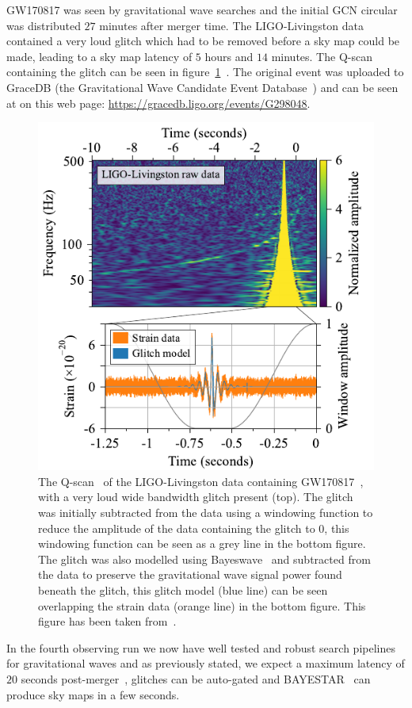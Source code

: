 GW170817 was seen by gravitational wave searches and the initial GCN circular was distributed $27$ minutes after merger time. The LIGO-Livingston data contained a very loud glitch which had to be removed before a sky map could be made, leading to a sky map latency of $5$ hours and $14$ minutes. The Q-scan containing the glitch can be seen in figure~\ref{6:fig:gw170817_glitch}~\cite{GW170817:2017}. The original event was uploaded to GraceDB (the Gravitational Wave Candidate Event Database~\cite{ligo_gracedb:2024}) and can be seen at on this web page: \href{https://gracedb.ligo.org/events/G298048}{https://gracedb.ligo.org/events/G298048}.
%
\begin{figure}
    \centering
    \includegraphics[width=1.0\linewidth]{images/6_earlywarning/gw170817/GW170817_glitch_subtraction.pdf}
    \caption{The Q-scan~\cite{qscan:2004} of the LIGO-Livingston data containing GW170817~\cite{GW170817:2017}, with a very loud wide bandwidth glitch present (top). The glitch was initially subtracted from the data using a windowing function to reduce the amplitude of the data containing the glitch to $0$, this windowing function can be seen as a grey line in the bottom figure. The glitch was also modelled using Bayeswave~\cite{BayesWave:2015} and subtracted from the data to preserve the gravitational wave signal power found beneath the glitch, this glitch model (blue line) can be seen overlapping the strain data (orange line) in the bottom figure. This figure has been taken from~\cite{GW170817:2017}.}
    \label{6:fig:gw170817_glitch}
\end{figure}
%
In the fourth observing run we now have well tested and robust search pipelines for gravitational waves and as previously stated, we expect a maximum latency of $20$ seconds post-merger~\cite{PyCBC_Live:2018}, glitches can be auto-gated and BAYESTAR~\cite{BAYESTAR:2016} can produce sky maps in a few seconds.

